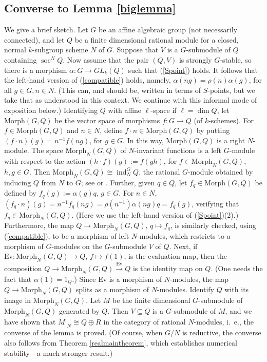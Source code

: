 \documentclass[11pt,leqno,amscd,amssymb,verbatim, url]{amsart}
\theoremstyle{definition}
\numberwithin{equation}{thm}
\newcommand{\ind}{\operatorname{ind}}
\newcommand{\soc}{\operatorname{soc}}
\begin{document}
\subsection{Converse to Lemma \ref{biglemma}} We give a brief sketch. Let $G$ be an affine algebraic group (not necessarily connected), and let $Q$ be a finite dimensional rational module for a closed, normal $k$-subgroup scheme $N$ of $G$. Suppose
that $V$ is a $G$-submodule of $Q$ containing $\soc^NQ$. Now assume that the pair $(Q,V)$ is strongly $G$-stable, so there
is a morphism $\alpha:G\to GL_k(Q)$ such that (\ref{Spoint}) holds.    It follows that the left-hand version of (\ref{compatible}) holds,
namely,  $\alpha(ng)=\rho(n)\alpha(g)$,
 for all $g\in G, n\in N$. (This can, and should be, written in terms of $S$-points, but we take
that as understood in this context. We continue with this
  informal mode of exposition below.) Identifying $Q$ with affine $\ell$-space if $\ell=\dim Q$, let $\text{Morph}(G,Q)$ be the
vector space of morphisms $f:G\to Q$ (of $k$-schemes). For $f\in\text{Morph}(G,Q)$ and $n\in N$, define $f\cdot n\in \text{Morph}(G,Q)$
by putting $(f\cdot n)(g)=n^{-1}f(ng)$, for $g\in G$.  In this way, $\text{Morph}(G,Q)$ is a right $N$-module.
The space $\text{Morph}_N(G,Q)$ of $N$-invariant functions is a left $G$-module with respect to the action $(h\cdot f)(g):=
f(gh)$, for $f\in \text{Morph}_N(G,Q)$, $h,g\in G$. Then $\text{Morph}_N(G,Q)\cong\ind_N^GQ$, the rational $G$-module obtained by inducing $Q$ from $N$ to $G$; see \cite{CPS} or \cite[I.3.3(2)]{Jan}.
Further, given $q\in Q$, let $f_q\in \text{Morph}(G,Q)$ be defined by $f_q(g):=\alpha(g)q$, $g\in G$. For $n\in N$,
$(f_q\cdot n)(g)=n^{-1}f_q(ng)=\rho(n^{-1})\alpha(ng)q=f_q(g)$, verifying that $f_q\in \text{Morph}_N(G,Q)$.   (Here we use the left-hand version of (\ref{Spoint})(2).) Furthermore,
the map $Q\to\text{Morph}_N(G,Q)$, $q\mapsto f_q$, is similarly checked, using (\ref{compatible}), to be a morphism of left $N$-modules, which restricts
to a morphism of $G$-modules on the $G$-submodule $V$ of $Q$.
Next, if $\text{Ev}:\text{Morph}_N(G,Q)\to Q$, $f\mapsto f(1)$, is the evaluation map, then the composition $Q\to \text{Morph}_N(G,Q)\overset{\text{Ev}}\to Q$ is the identity map on $Q$. (One needs the fact that $\alpha(1)=1_Q$.) Since Ev is a morphism of $N$-modules, the map $Q\to \text{Morph}_N(G,Q)$ splits as a morphism of $N$-modules. Identify $Q$ with its image in
$\text{Morph}_N(G,Q)$. Let $M$ be the finite dimensional
$G$-submodule of ${\text{Morph}}_N(G,Q)$ generated by $Q$. Then $V\subseteq Q$ is a $G$-submodule of $M$, and we have shown
that $M|_N\cong Q\oplus R$ in the category of rational $N$-modules, i.~e., the converse of the lemma is proved. (Of course, when $G/N$ is
reductive, the converse also follows from Theorem \ref{realmaintheorem}, which establishes numerical
stability---a much
stronger result.)
\end{document}
